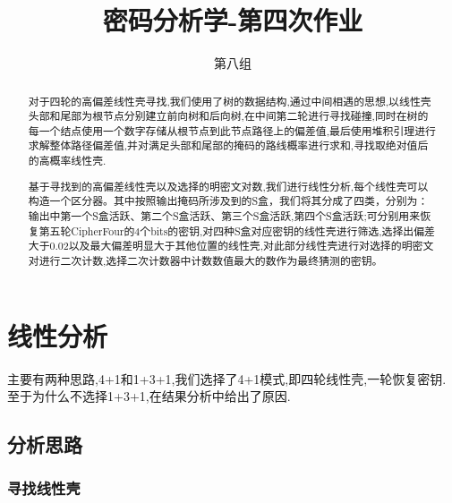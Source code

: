 \documentclass[UTF-8]{ctexart}
\title{密码分析学-第四次作业}
\author{第八组}
\begin{document}
\maketitle
\begin{abstract}
	对于四轮的高偏差线性壳寻找,我们使用了树的数据结构,通过中间相遇的思想,以线性壳头部和尾部为根节点分别建立前向树和后向树,在中间第二轮进行寻找碰撞,同时在树的每一个结点使用一个数字存储从根节点到此节点路径上的偏差值,最后使用堆积引理进行求解整体路径偏差值,并对满足头部和尾部的掩码的路线概率进行求和,寻找取绝对值后的高概率线性壳.\par
	\setlength{\parindent}{2em} 基于寻找到的高偏差线性壳以及选择的明密文对数,我们进行线性分析,每个线性壳可以构造一个区分器。其中按照输出掩码所涉及到的S盒，我们将其分成了四类，分别为：输出中第一个S盒活跃、第二个S盒活跃、第三个S盒活跃,第四个S盒活跃;可分别用来恢复第五轮CipherFour的4个bits的密钥,对四种S盒对应密钥的线性壳进行筛选,选择出偏差大于0.02以及最大偏差明显大于其他位置的线性壳,对此部分线性壳进行对选择的明密文对进行二次计数,选择二次计数器中计数数值最大的数作为最终猜测的密钥。\par
\end{abstract}
\newpage


\tableofcontents
\newpage

\section{线性分析}
主要有两种思路,4+1和1+3+1,我们选择了4+1模式,即四轮线性壳,一轮恢复密钥.至于为什么不选择1+3+1,在结果分析中给出了原因.
\subsection{分析思路}
\subsubsection{寻找线性壳}
\end{document}
